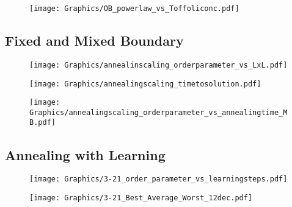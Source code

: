 \documentclass{beamer}
\begin{document}
\begin{frame}
  \begin{figure}
    \texttt{[image: Graphics/OB\_powerlaw\_vs\_Toffoliconc.pdf]}
\end{figure}
\end{frame}

\subsection{Fixed and Mixed Boundary}

\begin{frame}
  \begin{figure}
    \texttt{[image: Graphics/annealinscaling\_orderparameter\_vs\_LxL.pdf]}
  \end{figure}
\end{frame}

\begin{frame}
  \begin{figure}
    \texttt{[image: Graphics/annealingscaling\_timetosolution.pdf]}
  \end{figure}
\end{frame}


\begin{frame}
  \begin{figure}
    \texttt{[image: Graphics/annealingscaling\_orderparameter\_vs\_annealingtime\_MB.pdf]}
  \end{figure}
\end{frame}


\subsection{Annealing with Learning}

\begin{frame}
  \begin{figure}
    \texttt{[image: Graphics/3-21\_order\_parameter\_vs\_learningsteps.pdf]}
  \end{figure}
\end{frame}

\begin{frame}
  \begin{figure}
    \texttt{[image: Graphics/3-21\_Best\_Average\_Worst\_12dec.pdf]}
  \end{figure}
\end{frame}
\end{document}
